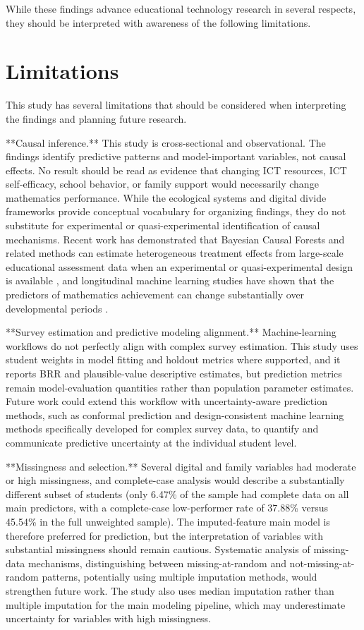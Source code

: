 \documentclass[pdflatex,sn-mathphys-ay]{sn-jnl}
\begin{document}
While these findings advance educational technology research in several respects, they should be interpreted with awareness of the following limitations.

\FloatBarrier
\section{Limitations}

This study has several limitations that should be considered when interpreting the findings and planning future research.

**Causal inference.** This study is cross-sectional and observational. The findings identify predictive patterns and model-important variables, not causal effects. No result should be read as evidence that changing ICT resources, ICT self-efficacy, school behavior, or family support would necessarily change mathematics performance. While the ecological systems and digital divide frameworks provide conceptual vocabulary for organizing findings, they do not substitute for experimental or quasi-experimental identification of causal mechanisms. Recent work has demonstrated that Bayesian Causal Forests and related methods can estimate heterogeneous treatment effects from large-scale educational assessment data when an experimental or quasi-experimental design is available \citep{McJames_2025}, and longitudinal machine learning studies have shown that the predictors of mathematics achievement can change substantially over developmental periods \citep{Lavelle_Hill_2024}.

**Survey estimation and predictive modeling alignment.** Machine-learning workflows do not perfectly align with complex survey estimation. This study uses student weights in model fitting and holdout metrics where supported, and it reports BRR and plausible-value descriptive estimates, but prediction metrics remain model-evaluation quantities rather than population parameter estimates. Future work could extend this workflow with uncertainty-aware prediction methods, such as conformal prediction \citep{Angelopoulos_Bates_2021} and design-consistent machine learning methods specifically developed for complex survey data, to quantify and communicate predictive uncertainty at the individual student level.

**Missingness and selection.** Several digital and family variables had moderate or high missingness, and complete-case analysis would describe a substantially different subset of students (only 6.47\% of the sample had complete data on all main predictors, with a complete-case low-performer rate of 37.88\% versus 45.54\% in the full unweighted sample). The imputed-feature main model is therefore preferred for prediction, but the interpretation of variables with substantial missingness should remain cautious. Systematic analysis of missing-data mechanisms, distinguishing between missing-at-random and not-missing-at-random patterns, potentially using multiple imputation methods, would strengthen future work. The study also uses median imputation rather than multiple imputation for the main modeling pipeline, which may underestimate uncertainty for variables with high missingness.
\end{document}
